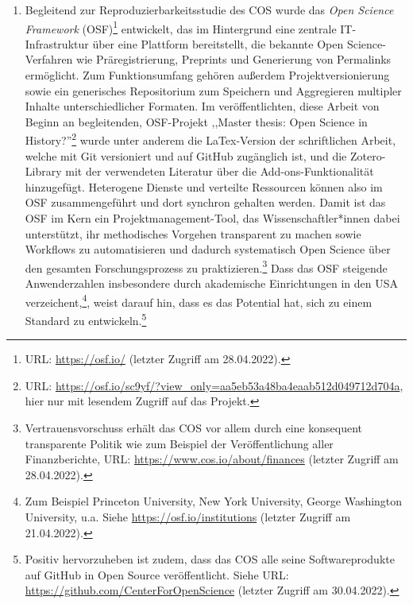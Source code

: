 \begin{enumerate}
\item Begleitend zur Reproduzierbarkeitsstudie des COS wurde das \textit{Open Science Framework} (OSF)\footnote{URL: \url{https://osf.io/} (letzter Zugriff am 28.04.2022).} entwickelt, das im Hintergrund eine zentrale IT- Infrastruktur über eine Plattform bereitstellt, die bekannte Open Science-Verfahren wie Präregistrierung, Preprints und Generierung von Permalinks ermöglicht. Zum Funktionsumfang gehören außerdem Projektversionierung sowie ein generisches Repositorium zum Speichern und Aggregieren multipler Inhalte unterschiedlicher Formaten. Im veröffentlichten, diese Arbeit von Beginn an begleitenden, OSF-Projekt ,,Master thesis: Open Science in History?''\footnote{URL: \url{https://osf.io/sc9yf/?view_only=aa5eb53a48ba4eaab512d049712d704a}, hier nur mit lesendem Zugriff auf das Projekt.} wurde unter anderem die LaTex-Version der schriftlichen Arbeit, welche mit Git versioniert und auf GitHub zugänglich ist, und die Zotero-Library mit der verwendeten Literatur über die Add-ons-Funktionalität hinzugefügt. Heterogene Dienste und verteilte Ressourcen können also im OSF zusammengeführt und dort synchron gehalten werden. Damit ist das OSF im Kern ein Projektmanagement-Tool, das Wissenschaftler*innen dabei unterstützt, ihr methodisches Vorgehen transparent zu machen sowie Workflows zu automatisieren und dadurch systematisch Open Science über den gesamten Forschungsprozess zu praktizieren.\footnote{Vertrauensvorschuss erhält das COS vor allem durch eine konsequent transparente Politik wie zum Beispiel der Veröffentlichung aller Finanzberichte, URL: \url{https://www.cos.io/about/finances} (letzter Zugriff am 28.04.2022).} Dass das OSF steigende Anwenderzahlen insbesondere durch akademische Einrichtungen in den USA verzeichent,\footnote{Zum Beispiel Princeton University, New York University, George Washington University, u.a. Siehe \url{https://osf.io/institutions} (letzter Zugriff am 21.04.2022).}, weist darauf hin, dass es das Potential hat, sich zu einem Standard zu entwickeln.\footnote{Positiv hervorzuheben ist zudem, dass das COS alle seine Softwareprodukte auf GitHub in Open Source veröffentlicht. Siehe URL: \url{https://github.com/CenterForOpenScience} (letzter Zugriff am 30.04.2022).}


\end{enumerate}
